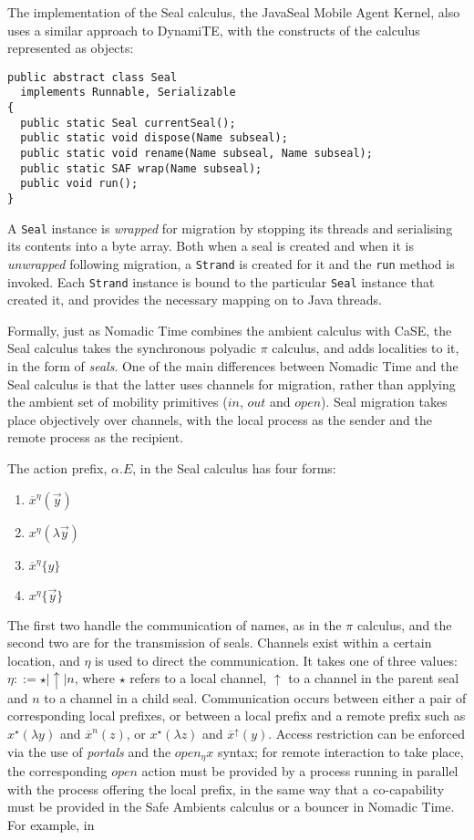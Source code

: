 The implementation of the Seal calculus, the JavaSeal Mobile Agent
Kernel, also uses a similar approach to DynamiTE, with the constructs
of the calculus represented as objects:

\begin{verbatim}
public abstract class Seal
  implements Runnable, Serializable
{
  public static Seal currentSeal();
  public static void dispose(Name subseal);
  public static void rename(Name subseal, Name subseal);
  public static SAF wrap(Name subseal);
  public void run();
}
\end{verbatim}

A \texttt{Seal} instance is \emph{wrapped} for migration by stopping
its threads and serialising its contents into a byte array.  Both when
a seal is created and when it is \emph{unwrapped} following migration,
a \texttt{Strand} is created for it and the \texttt{run} method is
invoked.  Each \texttt{Strand} instance is bound to the particular
\texttt{Seal} instance that created it, and provides the necessary
mapping on to Java threads.

Formally, just as Nomadic Time combines the ambient calculus with
CaSE, the Seal calculus takes the synchronous polyadic $\pi$ calculus,
and adds localities to it, in the form of \emph{seals}.  One of the
main differences between Nomadic Time and the Seal calculus is that
the latter uses channels for migration, rather than applying the
ambient set of mobility primitives ($in$, $out$ and $open$).  Seal
migration takes place objectively over channels, with the local
process as the sender and the remote process as the recipient.  

The action prefix, $\alpha.E$, in the Seal calculus has four forms:

\begin{enumerate}
\item $\overline{x}^\eta(\vec{y})$
\item $x^\eta(\lambda \vec{y})$
\item $\overline{x}^\eta\{y\}$
\item $x^\eta\{\vec{y}\}$
\end{enumerate}

The first two handle the communication of names, as in the $\pi$
calculus, and the second two are for the transmission of seals.
Channels exist within a certain location, and $\eta$ is used to direct
the communication.  It takes one of three values: $\eta ::= \star |
\uparrow | n$, where $\star$ refers to a local channel, $\uparrow$ to
a channel in the parent seal and $n$ to a channel in a child seal.
Communication occurs between either a pair of corresponding local
prefixes, or between a local prefix and a remote prefix such as
$x^\star(\lambda y)$ and $\overline x^n(z)$, or $x^\star(\lambda z)$
and $\overline{x}^\uparrow(y)$.  Access restriction can be enforced
via the use of \emph{portals} and the $open_\eta x$ syntax; for remote
interaction to take place, the corresponding $open$ action must be
provided by a process running in parallel with the process offering
the local prefix, in the same way that a co-capability must be
provided in the Safe Ambients calculus or a bouncer in Nomadic Time.
For example, in

